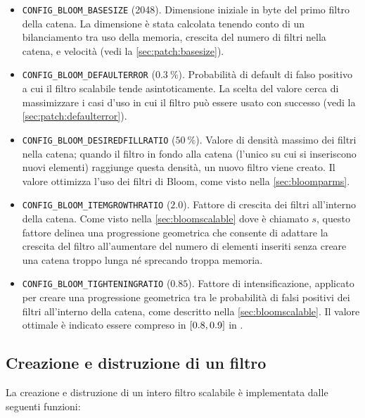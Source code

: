 \medskip
\begin{itemize}
  \item \verb|CONFIG_BLOOM_BASESIZE| (\SI{2048}{\byte}). Dimensione iniziale in byte del primo
  filtro della catena. La dimensione è stata calcolata tenendo conto di un bilanciamento tra uso
  della memoria, crescita del numero di filtri nella catena, e velocità (vedi la
  \autoref{sec:patch:basesize}).

  \item \verb|CONFIG_BLOOM_DEFAULTERROR| ($\SI{0.3}{\percent}$). Probabilità di default di falso
  positivo a cui il filtro scalabile tende asintoticamente. La scelta del valore cerca di
  massimizzare i casi d'uso in cui il filtro può essere usato con successo (vedi la
  \autoref{sec:patch:defaulterror}).

  \item \verb|CONFIG_BLOOM_DESIREDFILLRATIO| ($\SI{50}{\percent}$). Valore di densità massimo dei filtri
  nella catena; quando il filtro in fondo alla catena (l'unico su cui si inseriscono nuovi elementi)
  raggiunge questa densità, un nuovo filtro viene creato. Il valore ottimizza l'uso dei filtri di
  Bloom, come visto nella \autoref{sec:bloomparms}.

  \item \verb|CONFIG_BLOOM_ITEMGROWTHRATIO| ($\num{2.0}$). Fattore di crescita dei filtri
  all'interno della catena. Come visto nella \autoref{sec:bloomscalable} dove è chiamato
  $s$, questo fattore delinea una progressione geometrica che consente di adattare la crescita del
  filtro all'aumentare del numero di elementi inseriti senza creare una catena troppo lunga
  né sprecando troppa memoria.

  \item \verb|CONFIG_BLOOM_TIGHTENINGRATIO| ($\num{0.85}$). Fattore di intensificazione, applicato
  per creare una progressione geometrica tra le probabilità di falsi positivi dei filtri all'interno
  della catena, come descritto nella \autoref{sec:bloomscalable}. Il valore ottimale è indicato
  essere compreso in $\interval{0.8}{0.9}$ in \cite{bloomscalable}.

\end{itemize}
\medskip

\subsection{Creazione e distruzione di un filtro}

La creazione e distruzione di un intero filtro scalabile è implementata dalle seguenti funzioni:

